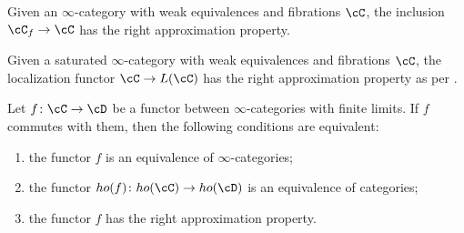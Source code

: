 \begin{exmp}
  Given an $\infty$-category with weak equivalences and fibrations $\cC$, the
  inclusion $\cC_f\rightarrow\cC$ has the right approximation property.
\end{exmp}

\begin{exmp}\label{764}
  Given a saturated $\infty$-category with weak equivalences and fibrations
  $\cC$, the localization functor $\cC\rightarrow L(\cC)$ has the right
  approximation property as per \cite[Ex.\ 7.6.4]{Cis19}.
\end{exmp}

\begin{thm}\label{7610}

  Let $f\colon\cC\rightarrow\cD$ be a functor between $\infty$-categories with
  finite limits. If $f$ commutes with them, then the following conditions are
  equivalent:
  \begin{enumerate}
    \item the functor $f$ is an equivalence of $\infty$-categories;
    \item the functor $ho(f)\colon ho(\cC)\rightarrow ho(\cD)$ is an equivalence
      of categories;
    \item the functor $f$ has the right approximation property.
  \end{enumerate}
\end{thm}
